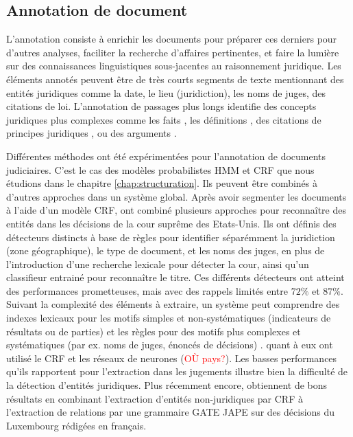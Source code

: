 \subsection{Annotation de document}

L'annotation consiste à enrichir les documents pour préparer ces derniers pour d'autres analyses, faciliter la recherche d'affaires pertinentes, et faire la lumière sur des connaissances linguistiques sous-jacentes au raisonnement juridique. Les éléments annotés peuvent être de très courts segments de texte mentionnant des entités juridiques \citep{Waltl2016lexia, wyner2010extractlegalelts} comme la date, le lieu (juridiction), les noms de juges, des citations de loi.  L'annotation de passages plus longs identifie des concepts juridiques plus complexes comme les faits \citep{wyner2010extractlegalelts, wyner2010casefactors, Shulayeva2017recognfactprincip}, les définitions \citep{Waltl2016lexia}, des citations de principes juridiques \citep{Shulayeva2017recognfactprincip}, ou des arguments \citep{WynerMoens2010mineargument}. 

Différentes méthodes ont été expérimentées pour l'annotation de documents judiciaires. C'est le cas des modèles probabilistes HMM et CRF que nous étudions dans le chapitre \ref{chap:structuration}. Ils peuvent être combinés à d'autres approches dans un système global. Après avoir segmenter les documents à l'aide d'un modèle CRF, \citet{dozier2010legalnerr} ont combiné plusieurs approches pour reconnaître des entités dans les décisions de la cour suprême des Etats-Unis. Ils ont définis des détecteurs distincts à base de règles pour identifier séparémment la juridiction (zone géographique), le type de document, et les noms des juges, en plus de l'introduction d'une recherche lexicale pour détecter la cour, ainsi qu'un classifieur entrainé pour reconnaître le titre. Ces différents détecteurs ont atteint des performances prometteuses, mais avec des rappels limités entre $ 72 \% $ et $ 87 \% $. Suivant la complexité des éléments à extraire, un système peut comprendre des indexes lexicaux pour les motifs simples et non-systématiques (indicateurs de résultats ou de parties) et les règles pour des motifs plus complexes et systématiques (par ex. noms de juges, énoncés de décisions) \citep{Waltl2016lexia, wyner2010extractlegalelts}. \cite{cardellino2017legalNERCL} quant à eux ont utilisé le CRF et les réseaux de neurones (\textcolor{red}{OÙ pays?}). Les basses performances qu'ils rapportent pour l'extraction dans les jugements illustre bien la difficulté de la détection d'entités juridiques. Plus récemment encore, \citet{andrew2018legalNerAndRelation} obtiennent de bons résultats en combinant l'extraction d'entités non-juridiques par CRF à l'extraction de relations par une grammaire GATE JAPE \citep{thakker2009gatejape} sur des décisions du Luxembourg rédigées en français.

